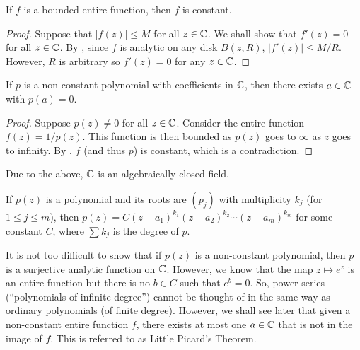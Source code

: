 	\begin{ftheo}
		\label{liouvilles theorem}
		If $f$ is a bounded entire function, then $f$ is constant.
	\end{ftheo}
	\begin{proof}
		Suppose that $|f(z)| \le M$ for all $z \in \mathbb{C}$. We shall show that $f'(z) = 0$ for all $z \in \mathbb{C}$. By , since $f$ is analytic on any disk $B(z,R)$, $|f'(z)| \le M/R$. However, $R$ is arbitrary so $f'(z) = 0$ for any $z \in \mathbb{C}$.
	\end{proof}

	\begin{ftheo}
		If $p$ is a non-constant polynomial with coefficients in $\mathbb{C}$, then there exists $a \in \mathbb{C}$ with $p(a) = 0$.
	\end{ftheo}
	\begin{proof}
		Suppose $p(z) \ne 0$ for all $z \in \mathbb{C}$. Consider the entire function $f(z) = 1/p(z)$. This function is then bounded as $p(z)$ goes to $\infty$ as $z$ goes to infinity. By , $f$ (and thus $p$) is constant, which is a contradiction.
	\end{proof}

	Due to the above, $\mathbb{C}$ is an algebraically closed field.

	\begin{corollary}
		If $p(z)$ is a polynomial and its roots are $(p_j)$ with multiplicity $k_j$ (for $1\le j\le m$), then $p(z) = C (z-a_1)^{k_1} (z-a_2)^{k_2} \cdots (z-a_m)^{k_m}$ for some constant $C$, where $\sum k_j$ is the degree of $p$.
	\end{corollary}

	It is not too difficult to show that if $p(z)$ is a non-constant polynomial, then $p$ is a surjective analytic function on $\mathbb{C}$. However, we know that the map  $z \mapsto e^z$ is an entire function but there is no $b \in C$ such that $e^b = 0$. So, power series (``polynomials of infinite degree'') cannot be thought of in the same way as ordinary polynomials (of finite degree). However, we shall see later that given a non-constant entire function $f$, there exists at most one $a \in \mathbb{C}$ that is not in the image of $f$. This is referred to as Little Picard's Theorem.

